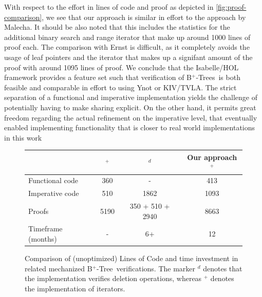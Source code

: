 \documentclass[a4paper,UKenglish,cleveref, autoref, thm-restate]{lipics-v2021}
\newcommand{\btree}{B$^+$-Tree}
\newcommand{\btrees}{B$^+$-Trees}
\begin{document}
With respect to the effort in lines of code and proof
as depicted in \autoref{fig:proof-comparison}, we see
that our approach is similar in effort to the approach by Malecha.
It should be also noted that this includes the statistics
for the additional binary search and range iterator
that make up around 1000 lines of proof each.
The comparison with Ernst is difficult, as it completely
avoids the usage of leaf pointers and the iterator
that makes up a signifant amount of the proof
with around 1095 lines of proof.
We conclude that the Isabelle/HOL framework
provides a feature set
such that verification of \btrees\ is both feasible
and comparable in effort to using Ynot or KIV/TVLA.
The strict separation of a functional and imperative
implementation yields the challenge
of potentially having to make sharing explicit.
On the other hand, it permits great freedom
regarding the actual refinement on the imperative level,
that eventually enabled
implementing functionality that is closer
to real world implementations in this work

\begin{figure}
    \centering
    \begin{tabular}{l|c|c|c}
        \                & \cite{DBLP:conf/popl/MalechaMSW10}$^{+}$ & \cite{DBLP:journals/sosym/ErnstSR15}$^{d}$ & Our approach$^{+}$ \\
        \hline
        Functional code &   360      & -                    & 413  \\ %
        Imperative code &   510      & 1862                  & 1093  \\
        Proofs          &  5190      & 350 + 510 + 2940\footnotemark[7] & 8663 \\
        Timeframe (months) &  -     & 6+                      & 12   \\
    \end{tabular}
    \caption[Comparison of (unoptimized) Lines of Code and time investment in related mechanized \btree\ verifications.]
    {Comparison of (unoptimized) Lines of Code and time investment in related mechanized \btree\ verifications.
    The marker $^d$ denotes that the implementation verifies deletion operations, whereas $^+$ denotes the implementation of iterators.
    }
    \label{fig:proof-comparison}
\end{figure}
\end{document}
